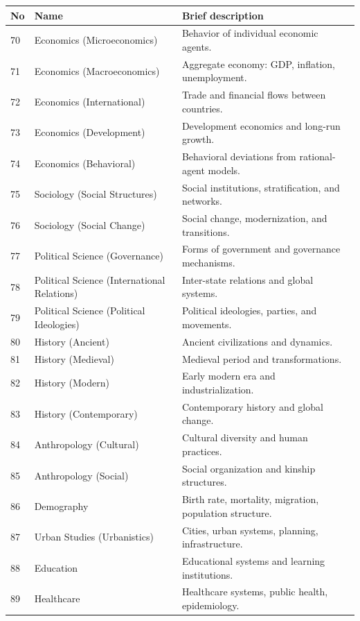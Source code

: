 \documentclass[13pt,a4paper]{article}
\begin{document}
	\begin{longtable}{|p{0.9cm}|p{6.0cm}|p{8.6cm}|}
		\hline
		\textbf{No} & \textbf{Name} & \textbf{Brief description} \\
		\hline
		\endhead
		70 & Economics (Microeconomics) & Behavior of individual economic agents. \\
		\hline
		71 & Economics (Macroeconomics) & Aggregate economy: GDP, inflation, unemployment. \\
		\hline
		72 & Economics (International) & Trade and financial flows between countries. \\
		\hline
		73 & Economics (Development) & Development economics and long-run growth. \\
		\hline
		74 & Economics (Behavioral) & Behavioral deviations from rational-agent models. \\
		\hline
		75 & Sociology (Social Structures) & Social institutions, stratification, and networks. \\
		\hline
		76 & Sociology (Social Change) & Social change, modernization, and transitions. \\
		\hline
		77 & Political Science (Governance) & Forms of government and governance mechanisms. \\
		\hline
		78 & Political Science (International Relations) & Inter-state relations and global systems. \\
		\hline
		79 & Political Science (Political Ideologies) & Political ideologies, parties, and movements. \\
		\hline
		80 & History (Ancient) & Ancient civilizations and dynamics. \\
		\hline
		81 & History (Medieval) & Medieval period and transformations. \\
		\hline
		82 & History (Modern) & Early modern era and industrialization. \\
		\hline
		83 & History (Contemporary) & Contemporary history and global change. \\
		\hline
		84 & Anthropology (Cultural) & Cultural diversity and human practices. \\
		\hline
		85 & Anthropology (Social) & Social organization and kinship structures. \\
		\hline
		86 & Demography & Birth rate, mortality, migration, population structure. \\
		\hline
		87 & Urban Studies (Urbanistics) & Cities, urban systems, planning, infrastructure. \\
		\hline
		88 & Education & Educational systems and learning institutions. \\
		\hline
		89 & Healthcare & Healthcare systems, public health, epidemiology. \\
		\hline
	\end{longtable}
	
\end{document}
